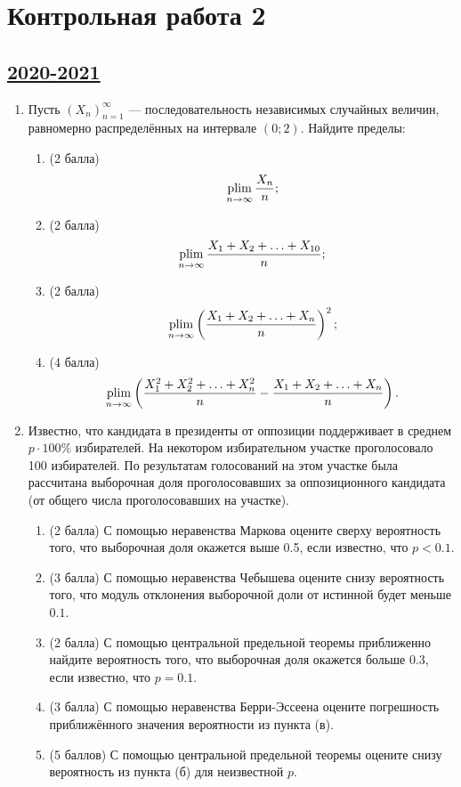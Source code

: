 \newpage
\thispagestyle{empty}
\section{Контрольная работа 2}

\subsection[2020-2021]{\hyperref[sec:sol_kr_02_2020_2021]{2020-2021}}
\label{sec:kr_02_2020_2021}


\begin{enumerate}
  \item Пусть $(X_n)_{n=1}^{\infty}$ — последовательность независимых случайных величин, равномерно распределённых на интервале $(0; 2)$. 
  Найдите пределы:
  
  \begin{enumerate}
      \item (2 балла) 
      \[
          \operatorname*{plim}\limits_{n\to\infty} \frac{X_n}{n};
      \]
      \item (2 балла) 
      \[ 
          \operatorname*{plim}\limits_{n\to\infty} \frac{X_1 + X_2 + \ldots + X_{10}}{n};
      \]
      \item (2 балла) 
      \[
           \operatorname*{plim}\limits_{n\to\infty} \left(\frac{X_1 + X_2 + \ldots + X_n}{n}\right)^2;
           \]
      
      \item (4 балла) 
      \[
           \operatorname*{plim}\limits_{n\to\infty} \left(\frac{X_1^2 + X_2^2 + \ldots + X_{n}^2}{n} - \frac{X_1 + X_2 + \ldots + X_{n}}{n}\right).
           \]
  \end{enumerate}
  
  \item Известно, что кандидата в президенты от оппозиции поддерживает в среднем $p\cdot 100\%$ избирателей. 
  На некотором избирательном участке проголосовало 100 избирателей. 
  По результатам голосований на этом участке была рассчитана выборочная доля проголосовавших 
  за оппозиционного кандидата (от общего числа проголосовавших на участке).
  
  \begin{enumerate}
      \item (2 балла) С помощью неравенства Маркова оцените сверху вероятность того, 
      что выборочная доля окажется выше 0.5, если известно, что $p<0.1$.
      \item (3 балла) С помощью неравенства Чебышева оцените снизу вероятность того, 
      что модуль отклонения выборочной доли от истинной будет меньше $0.1$.
      \item (2 балла) С помощью центральной предельной теоремы приближенно найдите вероятность того, 
      что выборочная доля окажется больше 0.3, если известно, что $p=0.1$.
      \item (3 балла) С помощью неравенства Берри-Эссеена оцените погрешность приближённого значения вероятности из пункта (в).
      \item (5 баллов) С помощью центральной предельной теоремы оцените снизу вероятность из пункта (б) для неизвестной $p$.
  \end{enumerate}
  

\end{enumerate}
